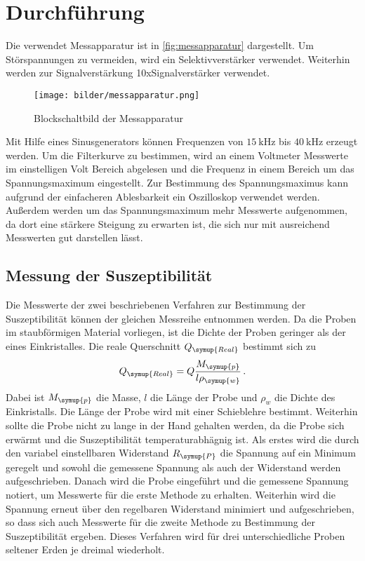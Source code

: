 \section{Durchführung}
\label{sec:Durchführung}
Die verwendet Messapparatur ist in \autoref{fig:messapparatur} dargestellt. Um Störspannungen zu vermeiden,
wird ein Selektivverstärker verwendet. Weiterhin werden zur Signalverstärkung 10xSignalverstärker verwendet.
\begin{figure}
    \centering
    \texttt{[image: bilder/messapparatur.png]}
    \caption{Blockschaltbild der Messapparatur}
    \label{fig:messapparatur}
\end{figure}
Mit Hilfe eines Sinusgenerators können Frequenzen von $\SI{15}{\kilo\hertz}$ bis $\SI{40}{\kilo\hertz}$ erzeugt
werden. Um die Filterkurve zu bestimmen, wird an einem Voltmeter Messwerte im einstelligen Volt Bereich abgelesen
und die Frequenz in einem Bereich um das Spannungsmaximum eingestellt. Zur Bestimmung des Spannungsmaximus kann
aufgrund der einfacheren Ablesbarkeit ein Oszilloskop verwendet werden. Außerdem werden um das Spannungsmaximum
mehr Messwerte aufgenommen, da dort eine stärkere Steigung zu erwarten ist, die sich nur mit ausreichend
Messwerten gut darstellen lässt.

\subsection{Messung der Suszeptibilität}
\label{sec:messung}
Die Messwerte der zwei beschriebenen Verfahren zur Bestimmung der Suszeptibilität können der gleichen Messreihe
entnommen werden. Da die Proben im staubförmigen Material vorliegen, ist die Dichte der Proben geringer als
der eines Einkristalles. Die reale Querschnitt $Q_{\symup{Real}}$ bestimmt sich zu
\begin{equation}
    Q_{\symup{Real}} = Q\frac{M_{\symup{p}}}{l\rho_{\symup{w}}}\,.
\end{equation}
Dabei ist $M_{\symup{p}}$ die Masse, $l$ die Länge der Probe und $\rho_{w}$ die Dichte des Einkristalls. Die Länge
der Probe wird mit einer Schieblehre bestimmt. Weiterhin sollte die Probe nicht zu lange in der Hand gehalten
werden, da die Probe sich erwärmt und die Suszeptibilität temperaturabhägnig ist. Als erstes wird die durch den
variabel einstellbaren Widerstand $R_{\symup{P}}$ die Spannung auf ein Minimum geregelt und sowohl die gemessene
Spannung als auch der Widerstand werden aufgeschrieben. Danach wird die Probe eingeführt und die gemessene Spannung
notiert, um Messwerte für die erste Methode zu erhalten. Weiterhin wird die Spannung erneut über den regelbaren
Widerstand minimiert und aufgeschrieben, so dass sich auch Messwerte für die zweite Methode zu Bestimmung der
Suszeptibilität ergeben. Dieses Verfahren wird für drei unterschiedliche Proben seltener Erden je dreimal
wiederholt.